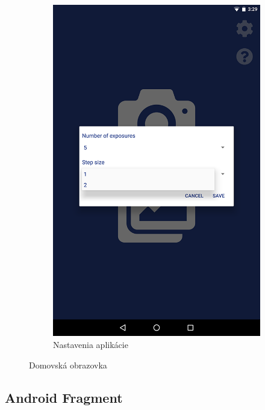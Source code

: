 \begin{figure}[h!]
\begin{subfigure}{0.35\textwidth}
        \includegraphics[width=\textwidth]{figures/ui/home/dialogSettings}
        \caption{Nastavenia aplikácie}
        \label{fig:homeScreen_settings}
    \end{subfigure}
    \caption{Domovská obrazovka}
    \label{fig:homeScreen}
\end{figure}

\subsection*{Android Fragment}

